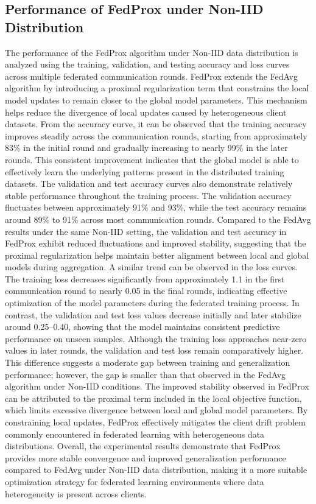 \documentclass[12pt]{book}
\begin{document}
\subsection{ Performance of FedProx under Non-IID Distribution}
The performance of the FedProx algorithm under Non-IID data distribution is analyzed using the training, validation, and testing accuracy and loss curves across multiple federated communication rounds. FedProx extends the FedAvg algorithm by introducing a proximal regularization term that constrains the local model updates to remain closer to the global model parameters. This mechanism helps reduce the divergence of local updates caused by heterogeneous client datasets.
From the accuracy curve, it can be observed that the training accuracy improves steadily across the communication rounds, starting from approximately 83\% in the initial round and gradually increasing to nearly 99\% in the later rounds. This consistent improvement indicates that the global model is able to effectively learn the underlying patterns present in the distributed training datasets.
The validation and test accuracy curves also demonstrate relatively stable performance throughout the training process. The validation accuracy fluctuates between approximately 91\% and 93\%, while the test accuracy remains around 89\% to 91\% across most communication rounds. Compared to the FedAvg results under the same Non-IID setting, the validation and test accuracy in FedProx exhibit reduced fluctuations and improved stability, suggesting that the proximal regularization helps maintain better alignment between local and global models during aggregation.
A similar trend can be observed in the loss curves. The training loss decreases significantly from approximately 1.1 in the first communication round to nearly 0.05 in the final rounds, indicating effective optimization of the model parameters during the federated training process. In contrast, the validation and test loss values decrease initially and later stabilize around 0.25–0.40, showing that the model maintains consistent predictive performance on unseen samples.
Although the training loss approaches near-zero values in later rounds, the validation and test loss remain comparatively higher. This difference suggests a moderate gap between training and generalization performance; however, the gap is smaller than that observed in the FedAvg algorithm under Non-IID conditions.
The improved stability observed in FedProx can be attributed to the proximal term included in the local objective function, which limits excessive divergence between local and global model parameters. By constraining local updates, FedProx effectively mitigates the client drift problem commonly encountered in federated learning with heterogeneous data distributions.
Overall, the experimental results demonstrate that FedProx provides more stable convergence and improved generalization performance compared to FedAvg under Non-IID data distribution, making it a more suitable optimization strategy for federated learning environments where data heterogeneity is present across clients.
\end{document}
